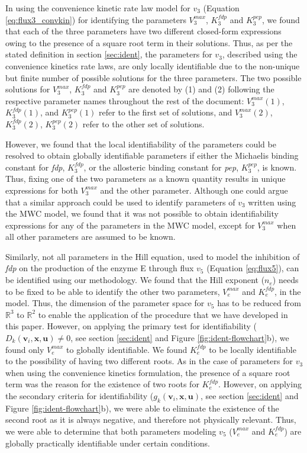 \documentclass[10pt]{article}
\begin{document}
	In using the convenience kinetic rate law model for $v_3$ (Equation \ref{eq:flux3_convkin}) for identifying the parameters $V_3^{max}$, $K_3^{fdp}$ and $K_3^{pep}$, we found that each of the three parameters have two different closed-form expressions owing to the presence of a square root term in their solutions. Thus, as per the stated definition in section \ref{sec:ident}, the parameters for $v_3$, described using the convenience kinetics rate laws, are only locally identifiable due to the non-unique but finite number of possible solutions for the three parameters. The two possible solutions for $V_3^{max}$, $K_3^{fdp}$ and $K_3^{pep}$ are denoted by (1) and (2) following the respective parameter names throughout the rest of the document: $V_3^{max}(1)$, $K_3^{fdp}(1)$, and $K_3^{pep}(1)$ refer to the first set of solutions, and $V_3^{max}(2)$, $K_3^{fdp}(2)$, $K_3^{pep}(2)$ refer to the other set of solutions. 
	
	However, we found that the local identifiability of the parameters could be resolved to obtain globally identifiable parameters if either the Michaelis binding constant for \textit{fdp}, $K_3^{fdp}$, or the allosteric binding constant for \textit{pep}, $K_3^{pep}$, is known. Thus, fixing one of the two parameters as a known quantity results in unique expressions for both $V_3^{max}$ and the other parameter. Although one could argue that a similar approach could be used to identify parameters of $v_3$ written using the MWC model, we found that it was not possible to obtain identifiability expressions for any of the parameters in the MWC model, except for $V_3^{max}$ when all other parameters are assumed to be known.	
	
	Similarly, not all parameters in the Hill equation, used to model the inhibition of \textit{fdp} on the production of the enzyme E through flux $v_5$ (Equation \ref{eq:flux5}), can be identified using our methodology. We found that the Hill exponent ($n_e$) needs to be fixed to be able to identify the other two parameters, $V_e^{max}$ and $K_e^{fdp}$, in the model. Thus, the dimension of the parameter space for $v_5$ has to be reduced from $\mathbb{R}^3$ to $\mathbb{R}^2$ to enable the application of the procedure that we have developed in this paper. However, on applying the primary test for identifiability ($D_k(\mathbf{v}_i, \mathbf{x}, \mathbf{u})\neq0$, see section \ref{sec:ident} and Figure \ref{fig:ident-flowchart}b), we found only $V_e^{max}$ to globally identifiable. We found $K_e^{fdp}$ to be locally identifiable to the possibility of having two different roots. As in the case of parameters for $v_3$ when using the convenience kinetics formulation, the presence of a square root term was the reason for the existence of two roots for $K_e^{fdp}$. However, on applying the secondary criteria for identifiability ($g_k(\mathbf{v}_i, \mathbf{x}, \mathbf{u})$, see section \ref{sec:ident} and Figure \ref{fig:ident-flowchart}b), we were able to eliminate the existence of the second root as it is always negative, and therefore not physically relevant. Thus, we were able to determine that both parameters modeling $v_5$ ($V_e^{max}$ and $K_e^{fdp}$) are globally practically identifiable under certain conditions.
	
\end{document}
